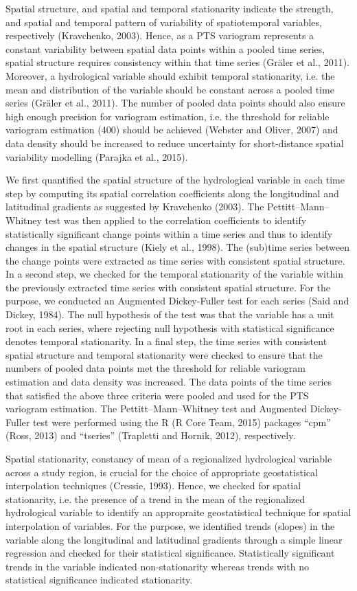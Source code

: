 Spatial structure, and spatial and temporal stationarity indicate the strength, and spatial and temporal pattern of variability of spatiotemporal variables, respectively (Kravchenko, 2003). Hence, as a PTS variogram represents a constant variability between spatial data points within a pooled time series, spatial structure requires consistency within that time series (Gräler et al., 2011). Moreover, a hydrological variable should exhibit temporal stationarity, i.e. the mean and distribution of the variable should be constant across a pooled time series (Gräler et al., 2011). The number of pooled data points should also ensure high enough precision for variogram estimation, i.e. the threshold for reliable variogram estimation (400) should be achieved (Webster and Oliver, 2007) and data density should be increased to reduce uncertainty for short-distance spatial variability modelling (Parajka et al., 2015).

We first quantified the spatial structure of  the hydrological variable in each time step by computing its spatial correlation coefficients along the longitudinal and latitudinal gradients as suggested by Kravchenko (2003). The Pettitt–Mann–Whitney test was then applied to the correlation coefficients to identify statistically significant change points within a time series and thus to identify changes in the spatial structure (Kiely et al., 1998). The (sub)time series between the change points were extracted as time series with consistent spatial structure. In a second step, we checked for the temporal stationarity of the variable within the previously extracted time series with consistent spatial structure. For the purpose, we conducted an Augmented Dickey-Fuller test for each series (Said and Dickey, 1984). The null hypothesis of the test was that the variable has a unit root in each series, where rejecting null hypothesis with statistical significance denotes temporal stationarity. In a final step, the time series with consistent spatial structure and temporal stationarity were checked to ensure that the numbers of pooled data points met the threshold for reliable variogram estimation and data density was increased. The data points of the time series that satisfied the above three criteria were pooled and used for the PTS variogram estimation. The Pettitt–Mann–Whitney test and Augmented Dickey-Fuller test were performed using the R (R Core Team, 2015) packages “cpm” (Ross, 2013) and “tseries” (Trapletti and Hornik, 2012), respectively.

Spatial stationarity, constancy of mean of a regionalized hydrological variable across a study region, is crucial for the choice of appropriate geostatistical interpolation techniques (Cressie, 1993). Hence, we checked for spatial stationarity, i.e. the presence of a trend in the mean of the regionalized hydrological variable to identify an appropraite geostatistical technique for spatial interpolation of variables. For the purpose, we identified trends (slopes) in the variable along the longitudinal and latitudinal gradients through a simple linear regression and checked for their statistical significance. Statistically significant trends in the variable indicated non-stationarity whereas trends with no statistical significance indicated stationarity.

